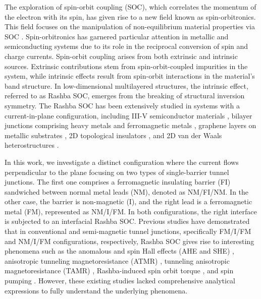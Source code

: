 \documentclass[10pt,pr,twocolumn,showpacs,amssymb,floatfix,superscriptaddress]{revtex4-1}
\begin{document}
The exploration of spin-orbit coupling (SOC), which correlates the momentum of the electron with its spin, 
has given rise to a new field known as spin-orbitronics. This field focuses on the manipulation of non-equilibrium material properties via SOC \cite{rashba,Soumyanarayanan2016,Manchon2019}. Spin-orbitronics has garnered particular attention in metallic and semiconducting systems due to its role in the reciprocal conversion of spin and charge currents. 
 Spin-orbit coupling arises from both extrinsic and intrinsic sources. Extrinsic contributions stem from spin-orbit-coupled impurities in the system, while intrinsic 
 effects result from spin-orbit interactions in the material's band structure. In low-dimensional multilayered structures, the intrinsic effect, referred to as Rashba SOC, emerges from the breaking of structural inversion symmetry. The Rashba SOC has been extensively studied in systems with a current-in-plane configuration, including III-V semiconductor materials \cite{sc}, bilayer junctions comprising heavy metals and ferromagnetic metals \cite{miron}, graphene layers on metallic substrates \cite{slg}, 2D topological insulators \cite{ti}, and 2D van der Waals heterostructures \cite{tmd}.




In this work, we investigate a distinct configuration where the current flows perpendicular to the plane focusing on two types of single-barrier tunnel junctions. The first one comprises a ferromagnetic insulating barrier (FI) sandwiched between normal metal leads (NM), denoted as NM/FI/NM. In the other case, the barrier is non-magnetic (I), and the right lead is a ferromagnetic metal (FM), represented as NM/I/FM. In both configurations, the right interface is subjected to an interfacial Rashba SOC. Previous studies have demonstrated that in conventional and semi-magnetic tunnel junctions, specifically FM/I/FM and NM/I/FM configurations, respectively, Rashba SOC gives rise to interesting phenomena such as the anomalous and spin Hall effects (AHE and SHE) \cite{ahe-she}, anisotropic tunneling magnetoresistance (ATMR) \cite{atmr0}, tunneling anisotropic magnetoresistance (TAMR) \cite{tamr0,half}, Rashba-induced spin orbit torque \cite{sot}, and spin pumping \cite{sp}. However, these existing studies lacked comprehensive analytical expressions to fully understand the underlying phenomena. 
\end{document}
